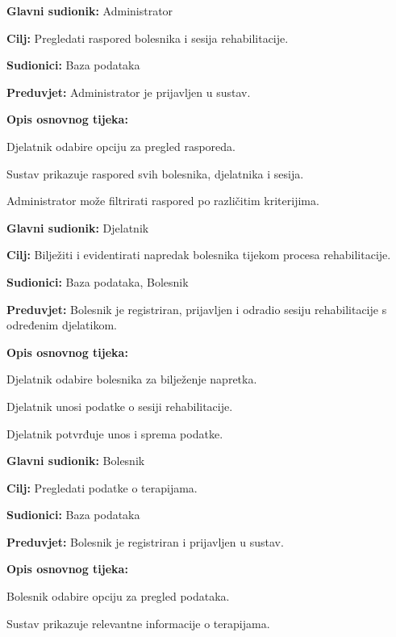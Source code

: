 	\item \textbf{Glavni sudionik:} Administrator
	\item \textbf{Cilj:} Pregledati raspored bolesnika i sesija rehabilitacije.
	\item \textbf{Sudionici:} Baza podataka
	\item \textbf{Preduvjet:} Administrator je prijavljen u sustav.
	\item \textbf{Opis osnovnog tijeka:}
	\begin{packed_enum}
		\item Djelatnik odabire opciju za pregled rasporeda.
		\item Sustav prikazuje raspored svih bolesnika, djelatnika i sesija.
		\item Administrator može filtrirati raspored po različitim kriterijima.
	\end{packed_enum}
\closeusecase

	\item \textbf{Glavni sudionik:} Djelatnik
	\item \textbf{Cilj:} Bilježiti i evidentirati napredak bolesnika tijekom procesa rehabilitacije.
	\item \textbf{Sudionici:} Baza podataka, Bolesnik
	\item \textbf{Preduvjet:} Bolesnik je registriran, prijavljen i odradio sesiju rehabilitacije s određenim djelatikom.
	\item \textbf{Opis osnovnog tijeka:}
	\begin{packed_enum}
		\item Djelatnik odabire bolesnika za bilježenje napretka.
		\item Djelatnik unosi podatke o sesiji rehabilitacije.
		\item Djelatnik potvrđuje unos i sprema podatke.
	\end{packed_enum}
\closeusecase

	\item \textbf{Glavni sudionik:} Bolesnik
	\item \textbf{Cilj:} Pregledati podatke o terapijama.
	\item \textbf{Sudionici:} Baza podataka
	\item \textbf{Preduvjet:} Bolesnik je registriran i prijavljen u sustav.
	\item \textbf{Opis osnovnog tijeka:}
	\begin{packed_enum}
		\item Bolesnik odabire opciju za pregled podataka.
		\item Sustav prikazuje relevantne informacije o terapijama.
	\end{packed_enum}
\closeusecase


